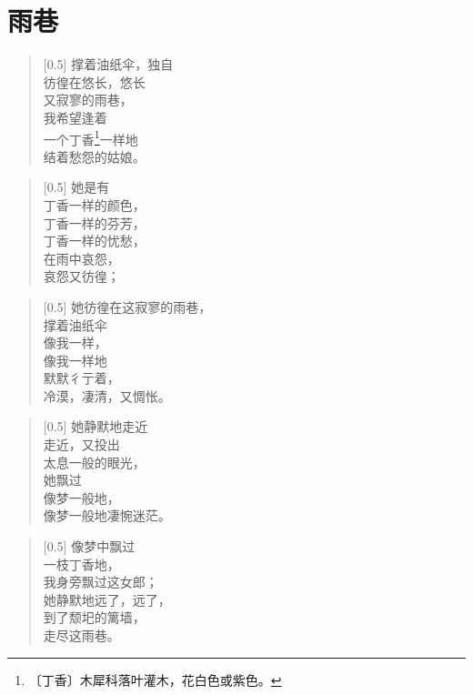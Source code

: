\documentclass[12pt,UTF-8,openany]{ctexbook}
\begin{document}
\chapter{雨巷}

\begin{normalsize}
    
    \begin{verse}[0.5\linewidth]
        撑着油纸伞，独自 \\
        彷徨在悠长，悠长 \\
        又寂寥的雨巷， \\
        我希望逢着 \\
        一个丁香\footnote{〔丁香〕木犀科落叶灌木，花白色或紫色。}一样地 \\
        结着愁怨的姑娘。
    \end{verse}
    
    
    \begin{verse}[0.5\linewidth]
        她是有 \\
        丁香一样的颜色， \\
        丁香一样的芬芳， \\
        丁香一样的忧愁， \\
        在雨中哀怨， \\
        哀怨又彷徨；
    \end{verse}
    
    
    \begin{verse}[0.5\linewidth]
        她彷徨在这寂寥的雨巷， \\
        撑着油纸伞 \\
        像我一样， \\
        像我一样地 \\
        默默彳亍着， \\
        冷漠，凄清，又惆怅。
    \end{verse}
    
    
    \begin{verse}[0.5\linewidth]
        她静默地走近 \\
        走近，又投出 \\
        太息一般的眼光， \\
        她飘过 \\
        像梦一般地， \\
        像梦一般地凄惋迷茫。
    \end{verse}
    
    
    \begin{verse}[0.5\linewidth]
        像梦中飘过 \\
        一枝丁香地， \\
        我身旁飘过这女郎； \\
        她静默地远了，远了， \\
        到了颓圯的篱墙， \\
        走尽这雨巷。
    \end{verse}
    

\end{normalsize}
\end{document}
